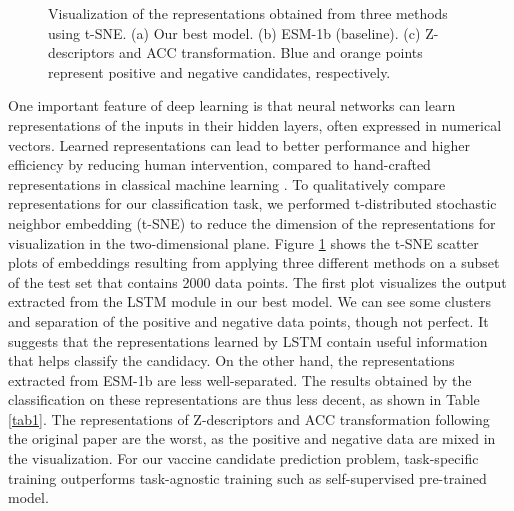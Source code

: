 \documentclass[conference]{IEEEtran}
\begin{document}
\begin{figure}
\centering
{}
\hfill
{}
\hfill
{}
\caption{Visualization of the representations obtained from three methods using t-SNE. (a) Our best model. (b) ESM-1b (baseline). (c) Z-descriptors and ACC transformation. Blue and orange points represent positive and negative candidates, respectively.}
\label{fig3}
\end{figure}

One important feature of deep learning is that neural networks can learn representations of the inputs in their hidden layers, often expressed in numerical vectors. Learned representations can lead to better performance and higher efficiency by reducing human intervention, compared to hand-crafted representations in classical machine learning \cite{LeCun_2015}. To qualitatively compare representations for our classification task, we performed t-distributed stochastic neighbor embedding (t-SNE) \cite{vandermaaten08a} to reduce the dimension of the representations for visualization in the two-dimensional plane. Figure \ref{fig3} shows the t-SNE scatter plots of embeddings resulting from applying three different methods on a subset of the test set that contains 2000 data points. The first plot visualizes the output extracted from the LSTM module in our best model. We can see some clusters and separation of the positive and negative data points, though not perfect. It suggests that the representations learned by LSTM contain useful information that helps classify the candidacy. On the other hand, the representations extracted from ESM-1b are less well-separated. The results obtained by the classification on these representations are thus less decent, as shown in Table \ref{tab1}. The representations of Z-descriptors and ACC transformation following the original paper \cite{Yang_2021} are the worst, as the positive and negative data are mixed in the visualization. For our vaccine candidate prediction problem, task-specific training outperforms task-agnostic training such as self-supervised pre-trained model.
\end{document}
